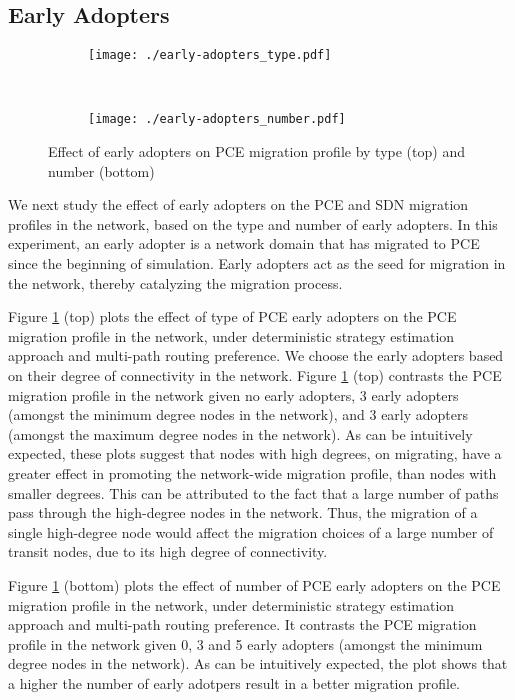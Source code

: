 \documentclass[smallextended]{svjour3}
\begin{document}
\subsection{Early Adopters}

\begin{figure}
\centering
\begin{subfigure}
\centering
\texttt{[image: ./early-adopters\_type.pdf]}
\end{subfigure}~ \begin{subfigure}
\centering
\texttt{[image: ./early-adopters\_number.pdf]}
\end{subfigure}
\caption{Effect of early adopters on PCE migration profile by type (top) and
number (bottom)}
\label{fig:effect of early adopters}
\end{figure}

\par We next study the effect of early adopters on the PCE and SDN migration
profiles in the network, based on the type and number of early adopters. In this
experiment, an early adopter is a network domain that has migrated to PCE since
the beginning of simulation. Early adopters act as the seed for migration in the network,
thereby catalyzing the migration process.

\par Figure \ref{fig:effect of early adopters} (top) plots the effect of type of
PCE early adopters on the PCE migration profile in the network, under
deterministic strategy estimation approach and multi-path routing preference. We
choose the early adopters based on their degree of connectivity in the network.
Figure \ref{fig:effect of early adopters} (top) contrasts the PCE migration
profile in the network given no early adopters, 3 early adopters (amongst the
minimum degree nodes in the network), and 3 early adopters (amongst the maximum
degree nodes in the network). As can be intuitively expected, these plots
suggest that nodes with high degrees, on migrating, have a greater effect in
promoting the network-wide migration profile, than nodes with smaller degrees.
This can be attributed to the fact that a large number of paths pass through
the high-degree nodes in the network. Thus, the migration of a
single high-degree node would affect the migration choices of a large number
of transit nodes, due to its high degree of connectivity.

\par Figure \ref{fig:effect of early adopters} (bottom) plots the effect of
number of PCE early adopters on the PCE migration profile in the network, under
deterministic strategy estimation approach and multi-path routing preference. It
contrasts the PCE migration profile in the network given 0, 3
and 5 early adopters (amongst the minimum degree nodes in the network). As can
be intuitively expected, the plot shows that a higher the number of early
adotpers result in a better migration profile.
\end{document}
